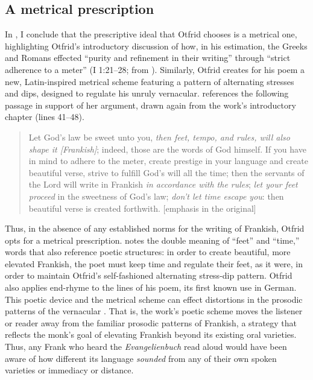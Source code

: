 \subsection{A metrical prescription }\label{sec:5.2.2}
\begin{sloppypar}
In \citet[44--46]{Somers2021b}, I conclude that the prescriptive ideal that Otfrid chooses is a metrical one, highlighting Otfrid’s introductory discussion of how, in his estimation, the Greeks and Romans effected “purity and refinement in their writing” through “strict adherence to a meter” (I 1:21--28; from \citealt[45]{Somers2021b}). Similarly, Otfrid creates for his poem a new, Latin-inspired metrical scheme featuring a pattern of alternating stresses and dips, designed to regulate his unruly vernacular. \citet[46]{Somers2021b} references the following passage in support of her argument, drawn again from the work’s introductory chapter (lines 41--48).
\end{sloppypar}

\begin{quote}
Let God’s law be sweet unto you, \textit{then feet, tempo, and rules, will also shape it [Frankish]}; indeed, those are the words of God himself. If you have in mind to adhere to the meter, create prestige in your language and create beautiful verse, strive to fulfill God’s will all the time; then the servants of the Lord will write in Frankish \textit{in accordance with the rules}; \textit{let your feet proceed} in the sweetness of God’s law; \textit{don’t let time escape you}: then beautiful verse is created forthwith. [emphasis in the original]
\end{quote}

\noindent Thus, in the absence of any established norms for the writing of Frankish, Otfrid opts for a metrical prescription. \citet[46]{Somers2021b} notes the double meaning of “feet” and “time,” words that also reference poetic structures: in order to create beautiful, more elevated Frankish, the poet must keep time and regulate their feet, as it were, in order to maintain Otfrid’s self-fashioned alternating stress-dip pattern. Otfrid also applies end-rhyme to the lines of his poem, its first known use in German. This poetic device and the metrical scheme can effect distortions in the prosodic patterns of the vernacular \citep[44--45]{Somers2021b}. That is, the work’s poetic scheme moves the listener or reader away from the familiar prosodic patterns of Frankish, a strategy that reflects the monk’s goal of elevating Frankish beyond its existing oral varieties. Thus, any Frank who heard the \textit{Evangelienbuch} read aloud would have been aware of how different its language \textit{sounded} from any of their own spoken varieties or immediacy or distance.

